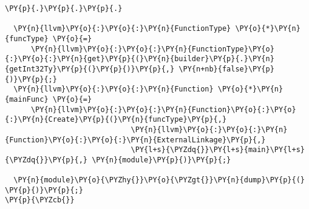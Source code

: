 \begin{Verbatim}[commandchars=\\\{\}]
          \PY{p}{.}\PY{p}{.}\PY{p}{.}

  \PY{n}{llvm}\PY{o}{:}\PY{o}{:}\PY{n}{FunctionType} \PY{o}{*}\PY{n}{funcType} \PY{o}{=} 
      \PY{n}{llvm}\PY{o}{:}\PY{o}{:}\PY{n}{FunctionType}\PY{o}{:}\PY{o}{:}\PY{n}{get}\PY{p}{(}\PY{n}{builder}\PY{p}{.}\PY{n}{getInt32Ty}\PY{p}{(}\PY{p}{)}\PY{p}{,} \PY{n+nb}{false}\PY{p}{)}\PY{p}{;}
  \PY{n}{llvm}\PY{o}{:}\PY{o}{:}\PY{n}{Function} \PY{o}{*}\PY{n}{mainFunc} \PY{o}{=} 
      \PY{n}{llvm}\PY{o}{:}\PY{o}{:}\PY{n}{Function}\PY{o}{:}\PY{o}{:}\PY{n}{Create}\PY{p}{(}\PY{n}{funcType}\PY{p}{,}
                             \PY{n}{llvm}\PY{o}{:}\PY{o}{:}\PY{n}{Function}\PY{o}{:}\PY{o}{:}\PY{n}{ExternalLinkage}\PY{p}{,}
                             \PY{l+s}{\PYZdq{}}\PY{l+s}{main}\PY{l+s}{\PYZdq{}}\PY{p}{,} \PY{n}{module}\PY{p}{)}\PY{p}{;}

  \PY{n}{module}\PY{o}{\PYZhy{}}\PY{o}{\PYZgt{}}\PY{n}{dump}\PY{p}{(} \PY{p}{)}\PY{p}{;}
\PY{p}{\PYZcb{}}
\end{Verbatim}
